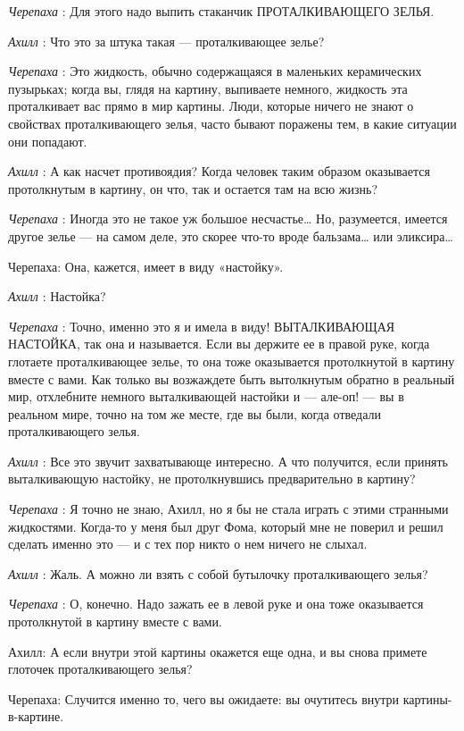 \emph{Черепаха} : Для этого надо выпить стаканчик ПРОТАЛКИВАЮЩЕГО ЗЕЛЬЯ.

\emph{Ахилл} : Что это за штука такая --- проталкивающее зелье?

\emph{Черепаха} : Это жидкость, обычно содержащаяся в маленьких керамических пузырьках; когда вы, глядя на картину, выпиваете немного, жидкость эта проталкивает вас прямо в мир картины. Люди, которые ничего не знают о свойствах проталкивающего зелья, часто бывают поражены тем, в какие ситуации они попадают.

\emph{Ахилл} : А как насчет противоядия? Когда человек таким образом оказывается протолкнутым в картину, он что, так и остается там на всю жизнь?

\emph{Черепаха} : Иногда это не такое уж большое несчастье\ldots{} Но, разумеется, имеется другое зелье --- на самом деле, это скорее что-то вроде бальзама\ldots{} или эликсира\ldots{}

Черепаха: Она, кажется, имеет в виду «настойку».

\emph{Ахилл} : Настойка?

\emph{Черепаха} : Точно, именно это я и имела в виду! ВЫТАЛКИВАЮЩАЯ НАСТОЙКА, так она и называется. Если вы держите ее в правой руке, когда глотаете проталкивающее зелье, то она тоже оказывается протолкнутой в картину вместе с вами. Как только вы возжаждете быть вытолкнутым обратно в реальный мир, отхлебните немного выталкивающей настойки и --- але-оп! --- вы в реальном мире, точно на том же месте, где вы были, когда отведали проталкивающего зелья.

\emph{Ахилл} : Все это звучит захватывающе интересно. А что получится, если принять выталкивающую настойку, не протолкнувшись предварительно в картину?

\emph{Черепаха} : Я точно не знаю, Ахилл, но я бы не стала играть с этими странными жидкостями. Когда-то у меня был друг Фома, который мне не поверил и решил сделать именно это --- и с тех пор никто о нем ничего не слыхал.

\emph{Ахилл} : Жаль. А можно ли взять с собой бутылочку проталкивающего зелья?

\emph{Черепаха} : О, конечно. Надо зажать ее в левой руке и она тоже оказывается протолкнутой в картину вместе с вами.

Ахилл: А если внутри этой картины окажется еще одна, и вы снова примете глоточек проталкивающего зелья?

Черепаха: Случится именно то, чего вы ожидаете: вы очутитесь внутри картины-в-картине.

